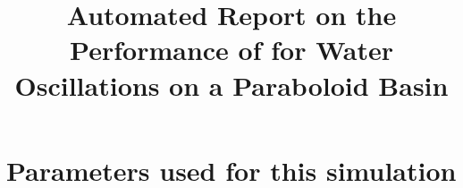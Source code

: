 \documentclass[11pt,a4paper]{article}%
\begin{document}
 

\title{Automated Report on the Performance of \anuga{} for Water Oscillations on a Paraboloid Basin}
\maketitle




\section{Parameters used for this simulation}






\end{document}
